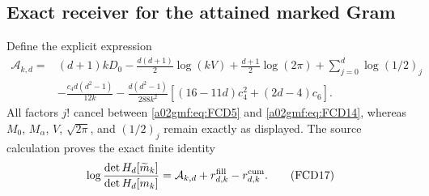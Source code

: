 \subsection{Exact receiver for the attained marked Gram}

Define the explicit expression
\begin{equation}
 \begin{split}
 \mathcal A_{k,d}={}&
 (d+1)kD_0-\frac{d(d+1)}2\log(kV)
 +\frac{d+1}2\log(2\pi)+\sum_{j=0}^d\log(1/2)_j\\
 &-\frac{c_4d(d^2-1)}{12k}
 -\frac{d(d^2-1)}{288k^2}
          [(16-11d)c_4^2+(2d-4)c_6].
 \end{split}
 \tag{FCD16}\label{a02gmf:eq:FCD16}
\end{equation}
All factors \(j!\) cancel between \eqref{a02gmf:eq:FCD5} and
\eqref{a02gmf:eq:FCD14}, whereas \(M_0\), \(M_\alpha\), \(V\),
\(\sqrt{2\pi}\), and \((1/2)_j\) remain exactly as displayed.
The source calculation proves the exact finite identity
\begin{equation}
 \log\frac{\det H_d[\widetilde m_k]}{\det H_d[m_k]}
       =\mathcal A_{k,d}+r_{d,k}^{\rm fill}-r_{d,k}^{\rm cum}.
 \tag{FCD17}\label{a02gmf:eq:FCD17}
\end{equation}

